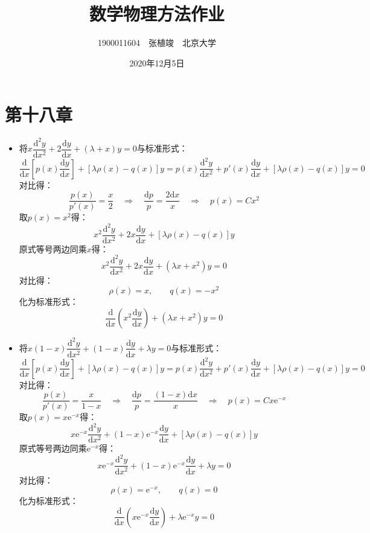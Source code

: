 \documentclass[a4paper,fontset=windows]{ctexart}
\begin{document}
\title{\textbf{数学物理方法作业}}
\author{1900011604\ \ 张植竣\ \ 北京大学}
\date{2020年12月5日}
\maketitle

\section*{第十八章}
\bigskip

\begin{itemize}

\item[1.(1)]
将$x\dfrac{\mathrm{d}^2 y}{\mathrm{d}x^2} + 2\dfrac{\mathrm{d}y}{\mathrm{d}x} + (\lambda+x)y = 0$与标准形式：
\[
\frac{\mathrm{d}}{\mathrm{d}x}\left[p(x)\frac{\mathrm{d}y}{\mathrm{d}x}\right] + \left[\lambda\rho(x) - q(x)\right]y = p(x)\frac{\mathrm{d}^2 y}{\mathrm{d}x^2} + p'(x)\frac{\mathrm{d}y}{\mathrm{d}x} + \left[\lambda\rho(x) - q(x)\right]y = 0
\]
对比得：
\[
\frac{p(x)}{p'(x)} = \frac{x}{2} \quad\Rightarrow\quad \frac{\mathrm{d}p}{p} = \frac{2\mathrm{d}x}{x} \quad\Rightarrow\quad p(x) = Cx^2
\]
取$p(x) = x^2$得：
\[
x^2\frac{\mathrm{d}^2 y}{\mathrm{d}x^2} + 2x\frac{\mathrm{d}y}{\mathrm{d}x} + \left[\lambda\rho(x) - q(x)\right]y
\]
原式等号两边同乘$x$得：
\[
x^2\dfrac{\mathrm{d}^2 y}{\mathrm{d}x^2} + 2x\dfrac{\mathrm{d}y}{\mathrm{d}x} + (\lambda x+x^2)y = 0
\]
对比得：
\[
\rho(x) = x,\qquad q(x) = -x^2
\]
化为标准形式：
\[
\frac{\mathrm{d}}{\mathrm{d}x}\left(x^2\frac{\mathrm{d}y}{\mathrm{d}x}\right) + \left(\lambda x+x^2\right)y = 0
\]
\medskip

\item[1.(3)]
将$x(1-x)\dfrac{\mathrm{d}^2 y}{\mathrm{d}x^2} + (1-x)\dfrac{\mathrm{d}y}{\mathrm{d}x} + \lambda y = 0$与标准形式：
\[
\frac{\mathrm{d}}{\mathrm{d}x}\left[p(x)\frac{\mathrm{d}y}{\mathrm{d}x}\right] + \left[\lambda\rho(x) - q(x)\right]y = p(x)\frac{\mathrm{d}^2 y}{\mathrm{d}x^2} + p'(x)\frac{\mathrm{d}y}{\mathrm{d}x} + \left[\lambda\rho(x) - q(x)\right]y = 0
\]
对比得：
\[
\frac{p(x)}{p'(x)} = \frac{x}{1-x} \quad\Rightarrow\quad \frac{\mathrm{d}p}{p} = \frac{(1-x)\mathrm{d}x}{x} \quad\Rightarrow\quad p(x) = Cx\mathrm{e}^{-x}
\]
取$p(x) = x\mathrm{e}^{-x}$得：
\[
x\mathrm{e}^{-x}\frac{\mathrm{d}^2 y}{\mathrm{d}x^2} + (1-x)\mathrm{e}^{-x}\frac{\mathrm{d}y}{\mathrm{d}x} + \left[\lambda\rho(x) - q(x)\right]y
\]
原式等号两边同乘$\mathrm{e}^{-x}$得：
\[
x\mathrm{e}^{-x}\dfrac{\mathrm{d}^2 y}{\mathrm{d}x^2} + (1-x)\mathrm{e}^{-x}\dfrac{\mathrm{d}y}{\mathrm{d}x} + \lambda y = 0
\]
对比得：
\[
\rho(x) = \mathrm{e}^{-x},\qquad q(x) = 0
\]
化为标准形式：
\[
\frac{\mathrm{d}}{\mathrm{d}x}\left(x\mathrm{e}^{-x}\frac{\mathrm{d}y}{\mathrm{d}x}\right) + \lambda\mathrm{e}^{-x}y = 0
\]
\bigskip


\end{itemize}
\end{document}

